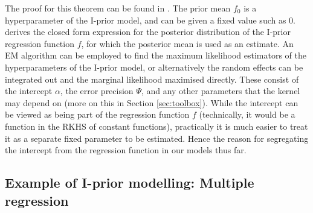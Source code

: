 The proof for this theorem can be found in \cite{Bergsma2014}. The prior mean $f_0$ is a hyperparameter of the I-prior model, and can be given a fixed value such as 0. \cite{Bergsma2014} derives the closed form expression for the posterior distribution of the I-prior regression function $f$, for which the posterior mean is used as an estimate. An EM algorithm can be employed to find the maximum likelihood estimators of the hyperparameters of the I-prior model, or alternatively the random effects can be integrated out and the marginal likelihood maximised directly. These consist of the intercept $\alpha$, the error precision $\Psi$, and any other parameters that the kernel may depend on (more on this in Section \ref{sec:toolbox}). While the intercept can be viewed as being part of the regression function $f$ (technically, it would be a function in the RKHS of constant functions), practically it is much easier to treat it as a separate fixed parameter to be estimated. Hence the reason for segregating the intercept from the regression function in our models thus far.

\subsection{Example of I-prior modelling: Multiple regression}
\label{sec:iprioreg}


